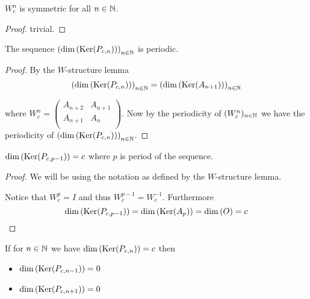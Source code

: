 \begin{corollary}
  $W_{c}^{n}$ is symmetric for all $n\in\mathbb{N}$.
\end{corollary}

\begin{proof}
  trivial.
\end{proof}

\begin{proposition}
  The sequence $\left(\dim\left(\operatorname{Ker}(P_{c,n})\right)\right)_{n\in\mathbb{N}}$
  is periodic.
\end{proposition}

\begin{proof}
  By the $W$-structure lemma
  \[
  \left(\dim\left(\operatorname{Ker}(P_{c,n})\right)\right)_{n\in\mathbb{N}} 
  = 
  \left(\dim\left(\operatorname{Ker}(A_{n+1})\right)\right)_{n\in\mathbb{N}}
  \]

  where $W_{c}^{n}=\left(\begin{smallmatrix} A_{n+2} & A_{n+1}  \\ A_{n+1} & A_{n} \\\end{smallmatrix}\right)$.
  Now  by the periodicity of $(W_{c}^{n})_{n\in\mathbb{N}}$ we have the
  periodicity of
  $\left(\dim\left(\operatorname{Ker}(P_{c,n})\right)\right)_{n\in\mathbb{N}}$.
\end{proof}

\begin{lemma}
  $\dim\left(\operatorname{Ker}(P_{c,p-1})\right) = c$ where $p$ is period of the sequence. 
\end{lemma}

\begin{proof}
  We will be using the notation as defined by the $W$-structure lemma.

  Notice that $W_{c}^{p} = I$ and thus $W_{c}^{p-1} = W_{c}^{-1}$.
  Furthermore
  \[
  \dim\left(\operatorname{Ker}(P_{c,p-1})\right)
  =
  \dim\left(\operatorname{Ker}(A_{p})\right) = \dim\left(O\right)
  = c
  \]
\end{proof}

\begin{lemma}
  If for $n\in\mathbb{N}$ we have $\dim\left(\operatorname{Ker}(P_{c,n})\right) = c$ then
  \begin{itemize}
    \item $\dim\left(\operatorname{Ker}(P_{c,n-1})\right) = 0$
    \item $\dim\left(\operatorname{Ker}(P_{c,n+1})\right) = 0$
  \end{itemize}
\end{lemma}

